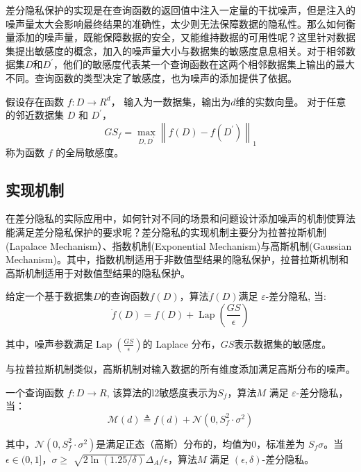 差分隐私保护的实现是在查询函数的返回值中注入一定量的干扰噪声，但是注入的噪声量太大会影响最终结果的准确性，太少则无法保障数据的隐私性。那么如何衡量添加的噪声量，既能保障数据的安全，又能维持数据的可用性呢？这里针对数据集提出敏感度的概念，加入的噪声量大小与数据集的敏感度息息相关。对于相邻数据集$D$和$D^{\prime}$，他们的敏感度代表某一个查询函数在这两个相邻数据集上输出的最大不同。查询函数的类型决定了敏感度，也为噪声的添加提供了依据。

\begin{define}[全局敏感度]\label{全局敏感度}
假设存在函数 $f: D \rightarrow R^{d}$， 输入为一数据集，输出为$d$维的实数向量。 对于任意的邻近数据集 $D$ 和 $D^{\prime}$，
$$
G S_{f}=\max _{D, D^{\prime}}\left\|f(D)-f\left(D^{\prime}\right)\right\|_{1}
$$
称为函数 $f$ 的全局敏感度。
\end{define}

\subsection{实现机制}
在差分隐私的实际应用中，如何针对不同的场景和问题设计添加噪声的机制使算法能满足差分隐私保护的要求呢？差分隐私的实现机制主要分为拉普拉斯机制(Lapalace Mechanism）、指数机制(Exponential Mechanism)与高斯机制(Gaussian Mechanism)。其中，指数机制适用于非数值型结果的隐私保护，拉普拉斯机制和高斯机制适用于对数值型结果的隐私保护。

\begin{theorem}[拉普拉斯机制]\label{拉普拉斯机制}
给定一个基于数据集$D$的查询函数$f(D)$，算法$\ddot{f}(D)$满足 $\varepsilon$-差分隐私, 当:
$$
\ddot{f}(D)=f(D)+\operatorname{Lap}\left(\frac{G S}{\epsilon}\right)
$$
\end{theorem}
其中，噪声参数满足$\operatorname{Lap}\left(\frac{G S}{\epsilon}\right)$的 Laplace 分布，$GS$表示数据集的敏感度。

与拉普拉斯机制类似，高斯机制对输入数据的所有维度添加满足高斯分布的噪声。
\begin{theorem}[高斯机制]\label{高斯机制}
一个查询函数 $f: D \rightarrow R$, 该算法的l2敏感度表示为$S_{f}$，算法$M$ 满足 $\varepsilon$-差分隐私，当：
$$
\mathcal{M}(d) \triangleq f(d)+\mathcal{N}\left(0, S_{f}^{2} \cdot \sigma^{2}\right)
$$
\end{theorem}
其中，$\mathcal{N}\left(0, S_{f}^{2} \cdot \sigma^{2}\right)$是满足正态（高斯）分布的，均值为0，标准差为 $S_{f} \sigma$。当$\epsilon \in(0,1]$，$\sigma \geq$ $\sqrt{2 \ln (1.25 / \delta)} \Delta_{A} / \epsilon$，算法$M$ 满足 $(\epsilon, \delta)$-差分隐私。

